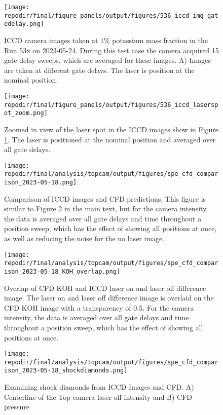 \begin{figure}
    \centering
    \texttt{[image: \\repodir/final/figure\_panels/output/figures/536\_iccd\_img\_gatedelay.png]} 
    \caption{ICCD camera images taken at 1\% potassium mass fraction in the Run 53x on 2023-05-24. During this test case the camera acquired 15 gate delay sweeps, which are averaged for these images. A) Images are taken at different gate delays. The laser is position at the nominal position. }
    \label{fig:SI_536_iccd}
\end{figure}


\begin{figure}
    \centering
    \texttt{[image: \\repodir/final/figure\_panels/output/figures/536\_iccd\_laserspot\_zoom.png]} 
    \caption{Zoomed in view of the laser spot in the ICCD images show in Figure \ref{fig:SI_536_iccd}. The laser is positioned at the nominal position and averaged over all gate delays.}
    \label{fig:SI_536_iccd_laserspot_zoom}
\end{figure}


\begin{figure}[]
\centering
\texttt{[image: \\repodir/final/analysis/topcam/output/figures/spe\_cfd\_comparison\_2023-05-18.png]}
\caption{Comparison of ICCD images and CFD predictions. This figure is similar to Figure 2 in the main text, but for the camera intensity, the data is averaged over all gate delays and time throughout a position sweep, which has the effect of showing all positions at once, as well as reducing the noise for the no laser image.}
\label{fig:SI_iccd_cfd_comparison}
\end{figure}


\begin{figure}[]
\centering
\texttt{[image: \\repodir/final/analysis/topcam/output/figures/spe\_cfd\_comparison\_2023-05-18\_KOH\_overlap.png]}
\caption{Overlap of CFD KOH and ICCD laser on and laser off difference image. The laser on and laser off difference image is overlaid on the CFD KOH image with a transparency of 0.5. For the camera intensity, the data is averaged over all gate delays and time throughout a position sweep, which has the effect of showing all positions at once.}
\label{fig:SI_iccd_cfd_comparison_KOH_overlap}
\end{figure}

\begin{figure}
    \centering
    \texttt{[image: \\repodir/final/analysis/topcam/output/figures/spe\_cfd\_comparison\_2023-05-18\_shockdiamonds.png]} 
    \caption{Examining shock diamonds from ICCD Images and CFD. A) Centerline of the Top camera laser off intensity and B) CFD pressure}
    \label{fig:SI_iccd_cfd_comparison_KOH}
\end{figure}

